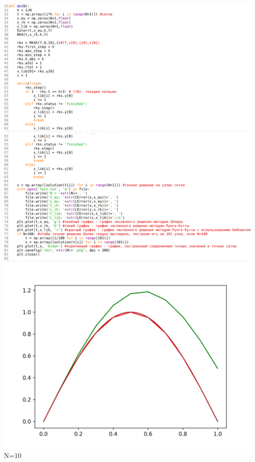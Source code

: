 \documentclass[a4paper,14pt]{article}
\begin{document}
\includegraphics[scale=0.20]{images/code/example test 2.png}
\includegraphics[scale=0.16]{images/code/example test 3.png}\newline
\includegraphics[scale=0.5]{images/graphs/тест_10.png}\newline
N=10\newline
\end{document}
